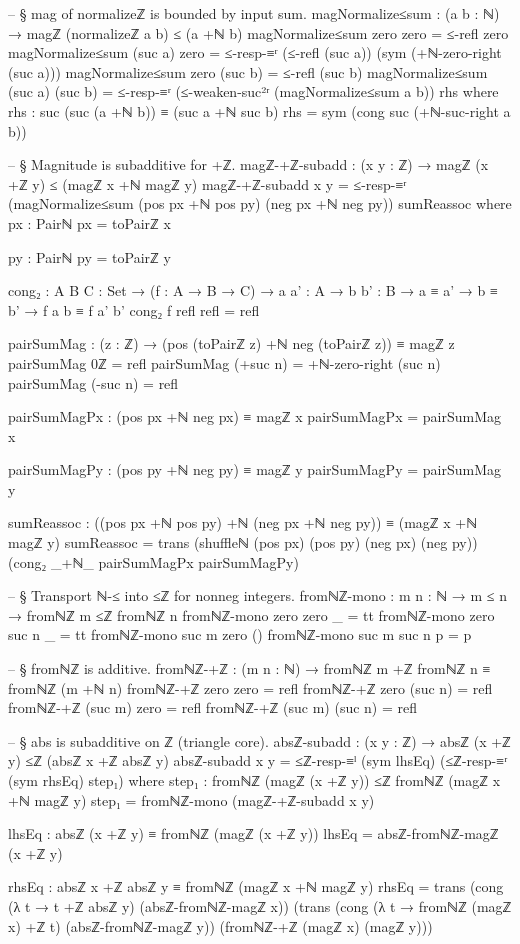 \documentclass[11pt,a4paper]{book}
\begin{document}
\begin{code}
-- § mag of normalizeℤ is bounded by input sum.
magNormalize≤sum : (a b : ℕ) → magℤ (normalizeℤ a b) ≤ (a +ℕ b)
magNormalize≤sum zero zero = ≤-refl zero
magNormalize≤sum (suc a) zero =
  ≤-resp-≡ʳ
    (≤-refl (suc a))
    (sym (+ℕ-zero-right (suc a)))
magNormalize≤sum zero (suc b) = ≤-refl (suc b)
magNormalize≤sum (suc a) (suc b) =
  ≤-resp-≡ʳ
    (≤-weaken-suc²ʳ (magNormalize≤sum a b))
    rhs
  where
    rhs : suc (suc (a +ℕ b)) ≡ (suc a +ℕ suc b)
    rhs = sym (cong suc (+ℕ-suc-right a b))

-- § Magnitude is subadditive for +ℤ.
magℤ-+ℤ-subadd : (x y : ℤ) → magℤ (x +ℤ y) ≤ (magℤ x +ℕ magℤ y)
magℤ-+ℤ-subadd x y =
  ≤-resp-≡ʳ
    (magNormalize≤sum (pos px +ℕ pos py) (neg px +ℕ neg py))
    sumReassoc
  where
    px : Pairℕ
    px = toPairℤ x

    py : Pairℕ
    py = toPairℤ y

    cong₂ : {A B C : Set} → (f : A → B → C) → {a a' : A} → {b b' : B} → a ≡ a' → b ≡ b' → f a b ≡ f a' b'
    cong₂ f refl refl = refl

    pairSumMag : (z : ℤ) → (pos (toPairℤ z) +ℕ neg (toPairℤ z)) ≡ magℤ z
    pairSumMag 0ℤ = refl
    pairSumMag (+suc n) = +ℕ-zero-right (suc n)
    pairSumMag (-suc n) = refl

    pairSumMagPx : (pos px +ℕ neg px) ≡ magℤ x
    pairSumMagPx = pairSumMag x

    pairSumMagPy : (pos py +ℕ neg py) ≡ magℤ y
    pairSumMagPy = pairSumMag y

    sumReassoc :
      ((pos px +ℕ pos py) +ℕ (neg px +ℕ neg py))
        ≡
      (magℤ x +ℕ magℤ y)
    sumReassoc =
      trans
        (shuffleℕ (pos px) (pos py) (neg px) (neg py))
        (cong₂ _+ℕ_ pairSumMagPx pairSumMagPy)

-- § Transport ℕ-≤ into ≤ℤ for nonneg integers.
fromℕℤ-mono : {m n : ℕ} → m ≤ n → fromℕℤ m ≤ℤ fromℕℤ n
fromℕℤ-mono {zero} {zero} _ = tt
fromℕℤ-mono {zero} {suc n} _ = tt
fromℕℤ-mono {suc m} {zero} ()
fromℕℤ-mono {suc m} {suc n} p = p

-- § fromℕℤ is additive.
fromℕℤ-+ℤ : (m n : ℕ) → fromℕℤ m +ℤ fromℕℤ n ≡ fromℕℤ (m +ℕ n)
fromℕℤ-+ℤ zero zero = refl
fromℕℤ-+ℤ zero (suc n) = refl
fromℕℤ-+ℤ (suc m) zero = refl
fromℕℤ-+ℤ (suc m) (suc n) = refl

-- § abs is subadditive on ℤ (triangle core).
absℤ-subadd : (x y : ℤ) → absℤ (x +ℤ y) ≤ℤ (absℤ x +ℤ absℤ y)
absℤ-subadd x y =
  ≤ℤ-resp-≡ˡ (sym lhsEq) (≤ℤ-resp-≡ʳ (sym rhsEq) step₁)
  where
    step₁ : fromℕℤ (magℤ (x +ℤ y)) ≤ℤ fromℕℤ (magℤ x +ℕ magℤ y)
    step₁ = fromℕℤ-mono (magℤ-+ℤ-subadd x y)

    lhsEq : absℤ (x +ℤ y) ≡ fromℕℤ (magℤ (x +ℤ y))
    lhsEq = absℤ-fromℕℤ-magℤ (x +ℤ y)

    rhsEq : absℤ x +ℤ absℤ y ≡ fromℕℤ (magℤ x +ℕ magℤ y)
    rhsEq =
      trans
        (cong (λ t → t +ℤ absℤ y) (absℤ-fromℕℤ-magℤ x))
        (trans
          (cong (λ t → fromℕℤ (magℤ x) +ℤ t) (absℤ-fromℕℤ-magℤ y))
          (fromℕℤ-+ℤ (magℤ x) (magℤ y)))
\end{code}
\end{document}
